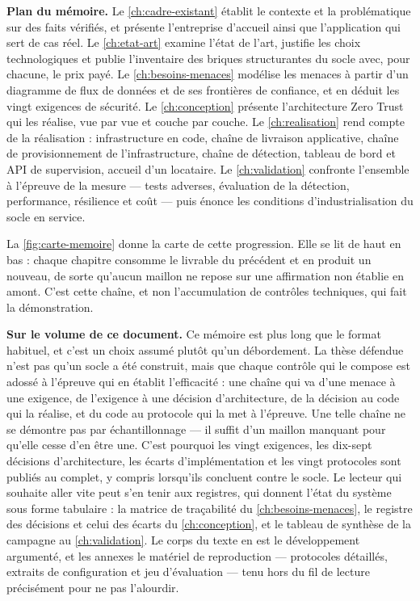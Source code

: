\textbf{Plan du mémoire.} Le \cref{ch:cadre-existant} établit le contexte et la problématique sur des faits
vérifiés, et présente l'entreprise d'accueil ainsi que l'application qui sert de cas réel. Le
\cref{ch:etat-art} examine l'état de l'art, justifie les choix technologiques et publie l'inventaire des
briques structurantes du socle avec, pour chacune, le prix payé. Le \cref{ch:besoins-menaces} modélise les
menaces à partir d'un diagramme de flux de données et de ses frontières de confiance, et en
déduit les vingt exigences de sécurité. Le \cref{ch:conception} présente l'architecture Zero Trust qui les
réalise, vue par vue et couche par couche. Le \cref{ch:realisation} rend compte de la réalisation :
infrastructure en code, chaîne de livraison applicative, chaîne de provisionnement de
l'infrastructure, chaîne de détection, tableau de bord et API de supervision, accueil d'un
locataire. Le \cref{ch:validation} confronte l'ensemble à l'épreuve de la mesure --- tests adverses,
évaluation de la détection, performance, résilience et coût --- puis énonce les conditions
d'industrialisation du socle en service.

La \cref{fig:carte-memoire} donne la carte de cette progression. Elle se lit de haut en bas :
chaque chapitre consomme le livrable du précédent et en produit un nouveau, de sorte qu'aucun
maillon ne repose sur une affirmation non établie en amont. C'est cette chaîne, et non
l'accumulation de contrôles techniques, qui fait la démonstration.

\textbf{Sur le volume de ce document.} Ce mémoire est plus long que le format habituel, et
c'est un choix assumé plutôt qu'un débordement. La thèse défendue n'est pas qu'un socle a été
construit, mais que chaque contrôle qui le compose est adossé à l'épreuve qui en établit
l'efficacité : une chaîne qui va d'une menace à une exigence, de l'exigence à une décision
d'architecture, de la décision au code qui la réalise, et du code au protocole qui la met à
l'épreuve. Une telle chaîne ne se démontre pas par échantillonnage --- il suffit d'un maillon
manquant pour qu'elle cesse d'en être une. C'est pourquoi les vingt exigences, les dix-sept
décisions d'architecture, les écarts d'implémentation et les vingt protocoles sont publiés au
complet, y compris lorsqu'ils concluent contre le socle.
Le lecteur qui souhaite aller vite peut s'en tenir aux registres, qui donnent l'état du système
sous forme tabulaire : la matrice de traçabilité du \cref{ch:besoins-menaces}, le registre des
décisions et celui des écarts du \cref{ch:conception}, et le tableau de synthèse de la campagne
au \cref{ch:validation}. Le corps du texte en est le développement argumenté, et les annexes le
matériel de reproduction --- protocoles détaillés, extraits de configuration et jeu
d'évaluation --- tenu hors du fil de lecture précisément pour ne pas l'alourdir.

